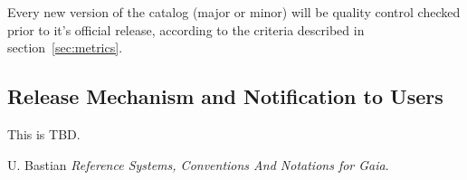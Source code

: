 \documentclass[a4paper, 11pt]{article}
\begin{document}
Every new version of the catalog (major or minor) will be quality control checked prior to it's official release, according to the criteria described in section~\ref{sec:metrics}.

\subsection{Release Mechanism and Notification to Users}

This is TBD.


\begin{thebibliography}{9}
 U. Bastian \emph{Reference Systems, Conventions And Notations for Gaia}.

\end{thebibliography}
\end{document}
